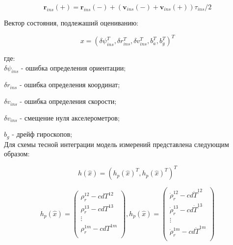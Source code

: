 	\begin{equation}
		\label{eq:coord}
		\bm r_{ins}(+) = \bm r_{ins}(-) + (\bm v_{ins}(-) + \bm v_{ins}(+)) \tau_{ins}/2
	\end{equation}


Вектор состояния, подлежаший оцениванию: 
	
\begin{equation} 
	\label{eq:state_vector}
	x = (\delta \psi_{ins} ^ T, \delta r_{ins} ^ T, \delta v_{ins} ^ T, 
	b_{a} ^ T, b_{g} ^ T) ^ T
\end{equation} 

\vspace{0.5cm}

где:  \\ 
	
	{ \large $ \delta \psi_{ins} $ } - ошибка определения ориентации;


    { \large $ \delta r_{ins} $ }    - ошибка определения координат; 
    
    
    { \large $ \delta v_{ins} $ }    - ошибка определения скорости;  
    
    
    { \large $ \delta v_{ins} $ }    - смещение нуля акселерометров; 
   
    
    { \large $ b_{g} $ }             - дрейф гироскопов; \\
    

Для схемы тесной интеграции модель измерений представлена следующим образом: 

\begin{equation}
	\label{eq:ins_19}
	h(\hat{x}) = (h_p(\hat{x})^T, h_{\dot{p}}(\hat{x})^T)^T
\end{equation}

\begin{equation*}
	h_p(\hat{x}) = 
	\begin{pmatrix}
		\rho_r^{12} - cdT^{12} \\
		\rho_r^{13} - cdT^{13} \\
		\vdots \\ 
		\rho_r^{1m} - cdT^{1m} \\
	\end{pmatrix}
	,
	h_{\dot{p}}(\hat{x}) = 
	\begin{pmatrix}
		\dot{\rho}_r^{12} - cd\dot{T}^{12} \\
		\dot{\rho}_r^{13} - cd\dot{T}^{13} \\
		\vdots \\ 
		\dot{\rho}_r^{1m} - cd\dot{T}^{1m} \\
	\end{pmatrix}
\end{equation*}


